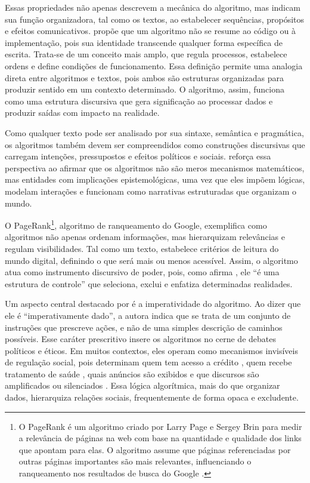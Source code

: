\documentclass[portuguese]{textolivre}
\begin{document}
Essas propriedades não apenas descrevem a mecânica do algoritmo, mas indicam sua função organizadora, tal como os textos, ao estabelecer sequências, propósitos e efeitos comunicativos. \textcite{hill2016} propõe que um algoritmo não se resume ao código ou à implementação, pois sua identidade transcende qualquer forma específica de escrita. Trata-se de um conceito mais amplo, que regula processos, estabelece ordens e define condições de funcionamento. Essa definição permite uma analogia direta entre algoritmos e textos, pois ambos são estruturas organizadas para produzir sentido em um contexto determinado. O algoritmo, assim, funciona como uma estrutura discursiva que gera significação ao processar dados e produzir saídas com impacto na realidade.

Como qualquer texto pode ser analisado por sua sintaxe, semântica e pragmática, os algoritmos também devem ser compreendidos como construções discursivas que carregam intenções, pressupostos e efeitos políticos e sociais. \textcite{hill2016} reforça essa perspectiva ao afirmar que os algoritmos não são meros mecanismos matemáticos, mas entidades com implicações epistemológicas, uma vez que eles impõem lógicas, modelam interações e funcionam como narrativas estruturadas que organizam o mundo.

O PageRank\footnote{O PageRank é um algoritmo criado por Larry Page e Sergey Brin para medir a relevância de páginas na web com base na quantidade e qualidade dos links que apontam para elas. O algoritmo assume que páginas referenciadas por outras páginas importantes são mais relevantes, influenciando o ranqueamento nos resultados de busca do Google \cite{brin1998}.}, algoritmo de ranqueamento do Google, exemplifica como algoritmos não apenas ordenam informações, mas hierarquizam relevâncias e regulam visibilidades. Tal como um texto, estabelece critérios de leitura do mundo digital, definindo o que será mais ou menos acessível. Assim, o algoritmo atua como instrumento discursivo de poder, pois, como afirma \textcite{hill2016}, ele “é uma estrutura de controle” que seleciona, exclui e enfatiza determinadas realidades.

Um aspecto central destacado por \textcite{hill2016} é a imperatividade do algoritmo. Ao dizer que ele é “imperativamente dado”, a autora indica que se trata de um conjunto de instruções que prescreve ações, e não de uma simples descrição de caminhos possíveis. Esse caráter prescritivo insere os algoritmos no cerne de debates políticos e éticos. Em muitos contextos, eles operam como mecanismos invisíveis de regulação social, pois determinam quem tem acesso a crédito \cite{loya2022}, quem recebe tratamento de saúde \cite{onwuegbuzia2024}, quais anúncios são exibidos \cite{farries2024} e que discursos são amplificados ou silenciados \cite{garcia2021}. Essa lógica algorítmica, mais do que organizar dados, hierarquiza relações sociais, frequentemente de forma opaca e excludente.
\end{document}
